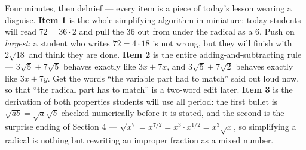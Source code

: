 \documentclass[10pt]{article}
\begin{document}
\begin{teachernote}
Four minutes, then debrief --- every item is a piece of today's lesson wearing a disguise.
\textbf{Item 1} is the whole simplifying algorithm in miniature: today students will read
$72=36\cdot 2$ and pull the $36$ out from under the radical as a $6$. Push on \emph{largest}: a
student who writes $72=4\cdot 18$ is not wrong, but they will finish with $2\sqrt{18}$ and think
they are done. \textbf{Item 2} is the entire adding-and-subtracting rule --- $3\sqrt5+7\sqrt5$
behaves exactly like $3x+7x$, and $3\sqrt5+7\sqrt2$ behaves exactly like $3x+7y$. Get the words
``the variable part had to match'' said out loud now, so that ``the radical part has to match'' is
a two-word edit later. \textbf{Item 3} is the derivation of both properties students will use all
period: the first bullet is $\sqrt{ab}=\sqrt a\sqrt b$ checked numerically before it is stated, and
the second is the surprise ending of Section 4 --- $\sqrt{x^7}=x^{7/2}=x^{3}\cdot x^{1/2}
=x^3\sqrt x$, so simplifying a radical is nothing but rewriting an improper fraction as a mixed
number.
\end{teachernote}
\end{document}
